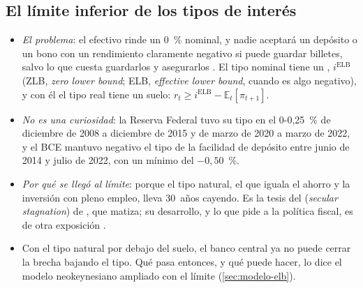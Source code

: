\documentclass[11pt]{article}
\begin{document}
\subsection{El límite inferior de los tipos de interés}\label{sec:limite-inferior}

\begin{itemize}
\item \emph{El problema}: el efectivo rinde un 0~\% nominal, y nadie aceptará un depósito o un bono con un rendimiento claramente negativo si puede guardar billetes, salvo lo que cuesta guardarlos y asegurarlos . El tipo nominal tiene un , $i^{\mathrm{ELB}}$ (ZLB, \emph{zero lower bound}; ELB, \emph{effective lower bound}, cuando es algo negativo), y con él el tipo real tiene un suelo: $r_t\geq i^{\mathrm{ELB}}-\mathbb{E}_t[\pi_{t+1}]$.
\item \emph{No es una curiosidad}: la Reserva Federal tuvo su tipo en el 0-0,25~\% de diciembre de 2008 a diciembre de 2015 y de marzo de 2020 a marzo de 2022, y el BCE mantuvo negativo el tipo de la facilidad de depósito entre junio de 2014 y julio de 2022, con un mínimo del $-0{,}50$~\%\nocite{FRED2026FedTipos,BCE2026FMEuribor}.
\item \emph{Por qué se llegó al límite}: porque el tipo natural, el que iguala el ahorro y la inversión con pleno empleo, lleva 30~años cayendo. Es la tesis del  (\emph{secular stagnation}) de , que  matiza; su desarrollo, y lo que pide a la política fiscal, es de otra exposición .
\item Con el tipo natural por debajo del suelo, el banco central ya no puede cerrar la brecha bajando el tipo. Qué pasa entonces, y qué puede hacer, lo dice el modelo neokeynesiano ampliado con el límite (\ref{sec:modelo-elb}).
\end{itemize}
\end{document}
